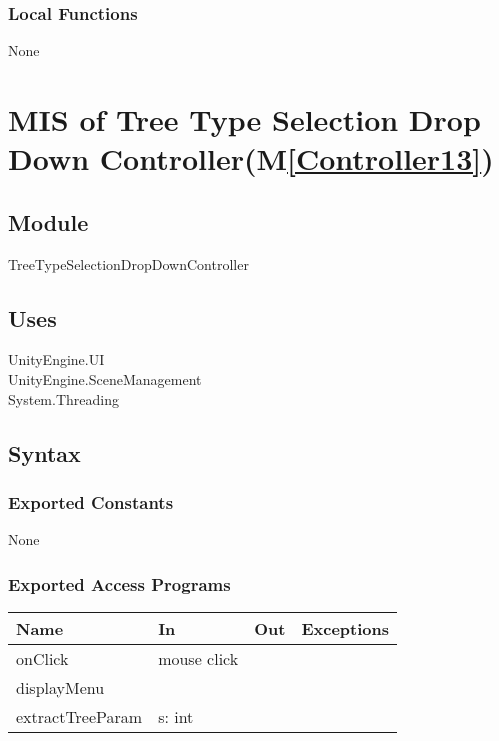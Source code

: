 \documentclass[12pt, titlepage]{article}
\newcommand{\mref}[1]{M\ref{#1}}
\begin{document}
\subsubsection{Local Functions}
None


\newpage

\section{MIS of Tree Type Selection Drop Down Controller(\mref{Controller13})} 

\subsection{Module}

TreeTypeSelectionDropDownController

\subsection{Uses}
UnityEngine.UI\\
UnityEngine.SceneManagement\\
System.Threading\\

\subsection{Syntax}

\subsubsection{Exported Constants}
None
\subsubsection{Exported Access Programs}

\begin{center}
\begin{tabular}{| l | l | l | p{5cm}|}
\hline
\textbf{Name} & \textbf{In} & \textbf{Out} & \textbf{Exceptions} \\
\hline
onClick & mouse click  &   & \\
\hline
displayMenu &&&\\
\hline
extractTreeParam & s: int &  &  \\
\hline
\end{tabular}
\end{center}
\end{document}
